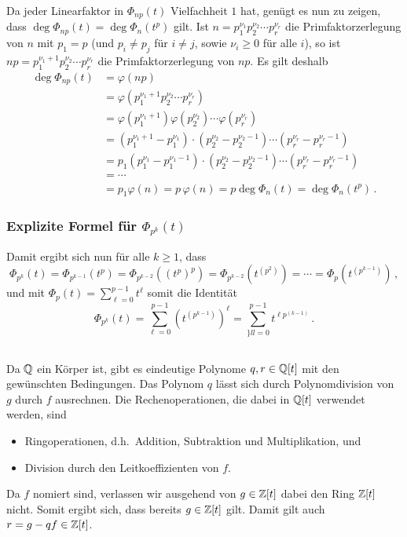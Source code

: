 Da jeder Linearfaktor in $\Phi_{np}(t)$ Vielfachheit $1$ hat, genügt es nun zu zeigen, dass $\deg \Phi_{np}(t) = \deg \Phi_n(t^p)$ gilt.
Ist $n = p_1^{\nu_1} p_2^{\nu_2} \dotsm p_r^{\nu_r}$ die Primfaktorzerlegung von $n$ mit $p_1 = p$ (und $p_i \neq p_j$ für $i \neq j$, sowie $\nu_i \geq 0$ für alle $i$), so ist $np = p_1^{\nu_1 + 1} p_2^{\nu_2} \dotsm p_r^{\nu_r}$ die Primfaktorzerlegung von $np$.
Es gilt deshalb
\begin{align*}
      \deg \Phi_{np}(t)
  &=  \varphi(np)
  \\
  &=  \varphi( p_1^{\nu_1 + 1} p_2^{\nu_2} \dotsm p_r^{\nu_r} )
  \\
  &=  \varphi( p_1^{\nu_1 + 1} ) \varphi( p_2^{\nu_2} ) \dotsm \varphi( p_r^{\nu_r} )
  \\
  &=  (p_1^{\nu_1 + 1} - p_1^{\nu_1}) \cdot ( p_2^{\nu_2} - p_2^{\nu_2 - 1} ) \dotsm ( p_r^{\nu_r} - p_r^{\nu_r - 1})
  \\
  &= p_1 (p_1^{\nu_1} - p_1^{\nu_1 - 1}) \cdot ( p_2^{\nu_2} - p_2^{\nu_2 - 1} ) \dotsm ( p_r^{\nu_r} - p_r^{\nu_r - 1})
  \\
  &= \dotsb
  \\
  &= p_1 \varphi(n)
   = p \, \varphi(n)
   = p \deg \Phi_n(t)
   = \deg \Phi_n(t^p) \,.
\end{align*}



\subsubsection*{Explizite Formel für $\Phi_{p^k}(t)$}

Damit ergibt sich nun für alle $k \geq 1$, dass
\[
    \Phi_{p^k}(t)
  = \Phi_{p^{k-1}}(t^p)
  = \Phi_{p^{k-2}}((t^p)^p)
  = \Phi_{p^{k-2}}\left( t^{(p^2)} \right)
  = \dotsb
  = \Phi_p\left( t^{(p^{k-1})} \right)\,,
\]
und mit $\Phi_p(t) = \sum_{\ell=0}^{p-1} t^\ell$ somit die Identität
\[
    \Phi_{p^k}(t)
  = \sum_{\ell=0}^{p-1} \left( t^{(p^{k-1})} \right)^\ell
  = \sum_{\}ll=0}^{p-1} t^{\ell p^{(k-1)}}\,.
\]





\subsection{}

Da $\mathbb{Q}$ ein Körper ist, gibt es eindeutige Polynome $q, r \in \mathbb{Q}[t]$ mit den gewünschten Bedingungen.
Das Polynom $q$ lässt sich durch Polynomdivision von $g$ durch $f$ ausrechnen.
Die Rechenoperationen, die dabei in $\mathbb{Q}[t]$ verwendet werden, sind
\begin{itemize}
  \item
    Ringoperationen, d.h.\ Addition, Subtraktion und Multiplikation, und
  \item
    Division durch den Leitkoeffizienten von $f$.
\end{itemize}
Da $f$ nomiert sind, verlassen wir ausgehend von $g \in \mathbb{Z}[t]$ dabei den Ring $\mathbb{Z}[t]$ nicht.
Somit ergibt sich, dass bereits $g \in \mathbb{Z}[t]$ gilt.
Damit gilt auch $r = g - qf \in \mathbb{Z}[t]$.

